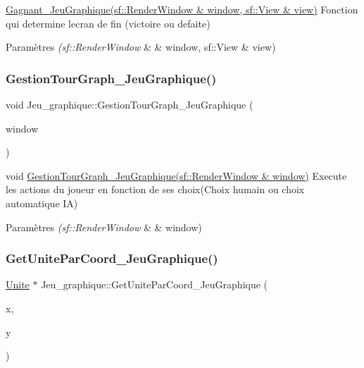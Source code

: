 \hyperlink{classJeu__graphique_aa26ebcc73b3dbe4c73de32266116e8ff}{Gagnant\+\_\+\+Jeu\+Graphique(sf\+::\+Render\+Window \& window, sf\+::\+View \& view)} Fonction qui determine l\textquotesingle{}ecran de fin (victoire ou defaite) 


\begin{DoxyParams}{Paramètres}
{\em (sf\+::\+Render\+Window} & \& window, sf\+::\+View \& view) \\
\hline
\end{DoxyParams}
\mbox{\label{classJeu__graphique_a70e411f6d6875e871939e99f35638486}} 
\subsubsection{\texorpdfstring{Gestion\+Tour\+Graph\+\_\+\+Jeu\+Graphique()}{GestionTourGraph\_JeuGraphique()}}
{\footnotesize\ttfamily void Jeu\+\_\+graphique\+::\+Gestion\+Tour\+Graph\+\_\+\+Jeu\+Graphique (\begin{DoxyParamCaption}\item[{sf\+::\+Render\+Window \&}]{window }\end{DoxyParamCaption})}



void \hyperlink{classJeu__graphique_a70e411f6d6875e871939e99f35638486}{Gestion\+Tour\+Graph\+\_\+\+Jeu\+Graphique(sf\+::\+Render\+Window \& window)} Execute les actions du joueur en fonction de ses choix(\+Choix humain ou choix automatique I\+A) 


\begin{DoxyParams}{Paramètres}
{\em (sf\+::\+Render\+Window} & \& window) \\
\hline
\end{DoxyParams}
\mbox{\label{classJeu__graphique_ae511b5ba17776963d2e40008e46c1ebc}} 
\subsubsection{\texorpdfstring{Get\+Unite\+Par\+Coord\+\_\+\+Jeu\+Graphique()}{GetUniteParCoord\_JeuGraphique()}}
{\footnotesize\ttfamily \hyperlink{classUnite}{Unite} $\ast$ Jeu\+\_\+graphique\+::\+Get\+Unite\+Par\+Coord\+\_\+\+Jeu\+Graphique (\begin{DoxyParamCaption}\item[{int}]{x,  }\item[{int}]{y }\end{DoxyParamCaption})}



